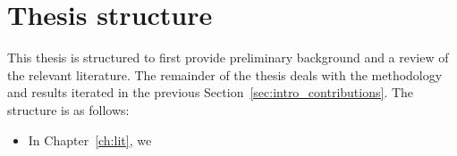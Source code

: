 \documentclass[\home/main.tex]{subfiles}
\begin{document}
\section{Thesis structure}
This thesis is structured to first provide preliminary background and a review of the relevant literature. The remainder of the thesis deals with the methodology and results iterated in the previous Section~\ref{sec:intro_contributions}. The structure is as follows:
\begin{itemize}
    \item In Chapter~\ref{ch:lit}, we
\end{itemize}
\end{document}
